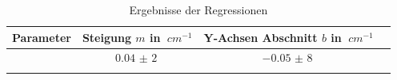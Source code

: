 \begin{table}[h!]
    \begin{center}
        \caption{Ergebnisse der Regressionen}
        \begin{tabular}{cccc}
            \hline
            Parameter & Steigung $m$ in $\SI{}{cm^{-1}}$   & Y-Achsen Abschnitt $b$ in $\SI{}{cm^{-1}}$\\
            \hline
                     & $\SI{0,04(2)}{}$   & $\SI{-0,05(8)}{}$ \\
            \hline
            \label{tab:abbe-Regression-results}
        \end{tabular}
    \end{center}
\end{table}
